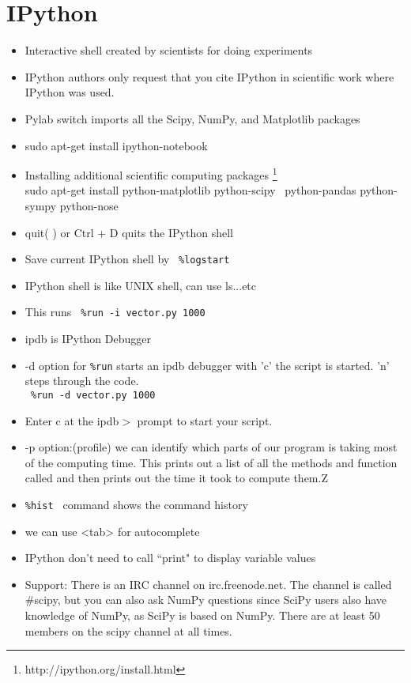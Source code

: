 \documentclass[12 pt , twoside, letterpaper] {article}
\begin{document}
\section{IPython}
\begin{itemize}
\item Interactive shell created by scientists for doing experiments 
\item IPython authors only request that you cite IPython in scientific work where IPython was used.
\item Pylab switch imports all the Scipy, NumPy, and Matplotlib packages
\item sudo apt-get install ipython-notebook
\item Installing additional scientific computing packages \footnote{http://ipython.org/install.html}
\\ sudo apt-get install python-matplotlib python-scipy \
python-pandas python-sympy python-nose
\item quit( ) or Ctrl + D quits the IPython shell
\item Save current IPython shell by
\verb! %logstart !
\item IPython shell is like UNIX shell, can use ls...etc
\item This runs \verb! %run -i vector.py 1000!
\item ipdb is IPython Debugger 
\item  -d  option for \verb!%run! starts an ipdb debugger with 'c' the script is started. 'n' steps through the code.
\\ \verb! %run -d vector.py 1000!
\item Enter c at the ipdb$>$ prompt to start your script.
\item -p option:(profile) we can identify which parts of our program is taking most of the computing time. This prints out a list of all the methods and function called and then prints out the time it took to compute them.Z
\item \verb!%hist ! command shows the command history
\item we can use <tab> for autocomplete
\item IPython don't need to call ``print" to display variable values
\item Support: There is an IRC channel on irc.freenode.net. The channel is called \#scipy, but you can also ask NumPy questions since SciPy users also have knowledge of NumPy, as SciPy is based on NumPy. There are at least 50 members on the scipy channel at all times.

\end{itemize}
\end{document}
